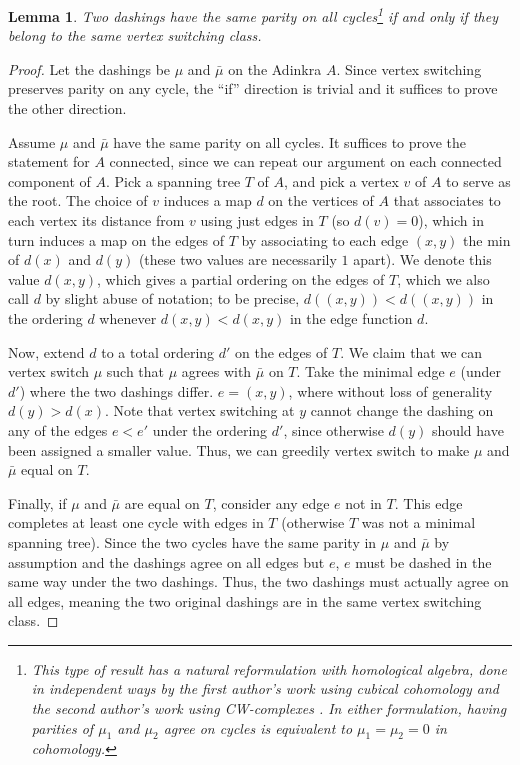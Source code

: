 \documentclass[12pt,twoside,singlespace]{article}
\numberwithin{equation}{section}
\newtheorem{lem}[equation]{Lemma}
\theoremstyle{definition}
\begin{document}
\begin{lem}
\label{lem:cycles-switching-class}
Two dashings have the same parity on all cycles\footnote{This type of result has a natural reformulation with homological algebra, done in independent ways by the first author's work using cubical cohomology \cite{dil:cohomology} and the second author's work using CW-complexes \cite{zhang:adinkras}. In either formulation, having parities of $\mu_1$ and $\mu_2$ agree on cycles is equivalent to $\mu_1 = \mu_2 = 0$ in cohomology.} if and only if they belong to the same vertex switching class.
\end{lem}

\begin{proof}
Let the dashings be $\mu$ and $\bar{\mu}$ on the Adinkra $A$. Since vertex switching preserves parity on any cycle, the ``if'' direction is trivial and it suffices to prove the other direction.

Assume $\mu$ and $\bar{\mu}$ have the same parity on all cycles. It suffices to prove the statement for $A$ connected, since we can repeat our argument on each connected component of $A$. Pick a spanning tree $T$ of $A$, and pick a vertex $v$ of $A$ to serve as the root. The choice of $v$ induces a map $d$ on the vertices of $A$ that associates to each vertex its distance from $v$ using just edges in $T$ (so $d(v) = 0$), which in turn induces a map on the edges of $T$ by associating to each edge $(x,y)$ the min of $d(x)$ and $d(y)$ (these two values are necessarily $1$ apart). We denote this value $d(x,y)$, which gives a partial ordering on the edges of $T$, which we also call $d$ by slight abuse of notation; to be precise, $d((x,y)) < d((x,y))$ in the ordering $d$ whenever $d(x,y) < d(x,y)$ in the edge function $d$.

Now, extend $d$ to a total ordering $d'$ on the edges of $T$. We claim that we can vertex switch $\mu$ such that $\mu$ agrees with $\bar{\mu}$ on $T$. Take the minimal edge $e$ (under $d'$) where the two dashings differ. $e = (x,y)$, where without loss of generality $d(y) > d(x)$. Note that vertex switching at $y$ cannot change the dashing on any of the edges $e < e'$ under the ordering $d'$, since otherwise $d(y)$ should have been assigned a smaller value. Thus, we can greedily vertex switch to make $\mu$ and $\bar{\mu}$ equal on $T$.

Finally, if $\mu$ and $\bar{\mu}$ are equal on $T$, consider any edge $e$ not in $T$. This edge completes at least one cycle with edges in $T$ (otherwise $T$ was not a minimal spanning tree). Since the two cycles have the same parity in $\mu$ and $\bar{\mu}$ by assumption and the dashings agree on all edges but $e$, $e$ must be dashed in the same way under the two dashings. Thus, the two dashings must actually agree on all edges, meaning the two original dashings are in the same vertex switching class.

\end{proof}
\end{document}
